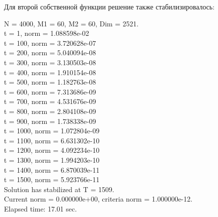 \documentclass[12pt,a4paper]{article}
\begin{document}
Для второй собственной функции решение также стабилизировалось:
\begin{center}
N = 4000, M1 =  60, M2 =  60, Dim =   2521.                   \\
t =   1, norm = 1.088598e-02                                  \\
t = 100, norm = 3.720628e-07                                  \\
t = 200, norm = 5.040094e-08                                  \\
t = 300, norm = 3.130503e-08                                  \\
t = 400, norm = 1.910154e-08                                  \\
t = 500, norm = 1.182763e-08                                  \\
t = 600, norm = 7.313686e-09                                  \\
t = 700, norm = 4.531676e-09                                  \\
t = 800, norm = 2.804108e-09                                  \\
t = 900, norm = 1.738338e-09                                  \\
t = 1000, norm = 1.072804e-09                                 \\
t = 1100, norm = 6.631302e-10                                 \\
t = 1200, norm = 4.092234e-10                                 \\
t = 1300, norm = 1.994203e-10                                 \\
t = 1400, norm = 6.870039e-11                                 \\
t = 1500, norm = 5.923766e-11                                 \\
Solution has stabilized at T = 1509.                          \\
Current norm = 0.000000e+00, criteria norm = 1.000000e-12.    \\
Elapsed time: 17.01 sec.
\end{center}
\end{document}
